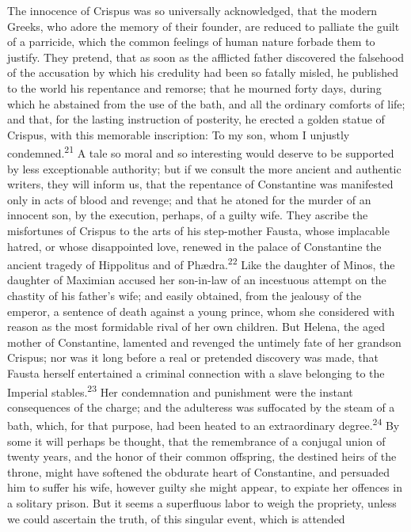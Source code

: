 The innocence of Crispus was so universally acknowledged, that
the modern Greeks, who adore the memory of their founder, are
reduced to palliate the guilt of a parricide, which the common
feelings of human nature forbade them to justify. They pretend,
that as soon as the afflicted father discovered the falsehood of
the accusation by which his credulity had been so fatally misled,
he published to the world his repentance and remorse; that he
mourned forty days, during which he abstained from the use of the
bath, and all the ordinary comforts of life; and that, for the
lasting instruction of posterity, he erected a golden statue of
Crispus, with this memorable inscription: To my son, whom I
unjustly condemned.\textsuperscript{21} A tale so moral and so interesting would
deserve to be supported by less exceptionable authority; but if
we consult the more ancient and authentic writers, they will
inform us, that the repentance of Constantine was manifested only
in acts of blood and revenge; and that he atoned for the murder
of an innocent son, by the execution, perhaps, of a guilty wife.
They ascribe the misfortunes of Crispus to the arts of his
step-mother Fausta, whose implacable hatred, or whose
disappointed love, renewed in the palace of Constantine the
ancient tragedy of Hippolitus and of Phædra.\textsuperscript{22} Like the daughter
of Minos, the daughter of Maximian accused her son-in-law of an
incestuous attempt on the chastity of his father’s wife; and
easily obtained, from the jealousy of the emperor, a sentence of
death against a young prince, whom she considered with reason as
the most formidable rival of her own children. But Helena, the
aged mother of Constantine, lamented and revenged the untimely
fate of her grandson Crispus; nor was it long before a real or
pretended discovery was made, that Fausta herself entertained a
criminal connection with a slave belonging to the Imperial
stables.\textsuperscript{23} Her condemnation and punishment were the instant
consequences of the charge; and the adulteress was suffocated by
the steam of a bath, which, for that purpose, had been heated to
an extraordinary degree.\textsuperscript{24} By some it will perhaps be thought,
that the remembrance of a conjugal union of twenty years, and the
honor of their common offspring, the destined heirs of the
throne, might have softened the obdurate heart of Constantine,
and persuaded him to suffer his wife, however guilty she might
appear, to expiate her offences in a solitary prison. But it
seems a superfluous labor to weigh the propriety, unless we could
ascertain the truth, of this singular event, which is attended
